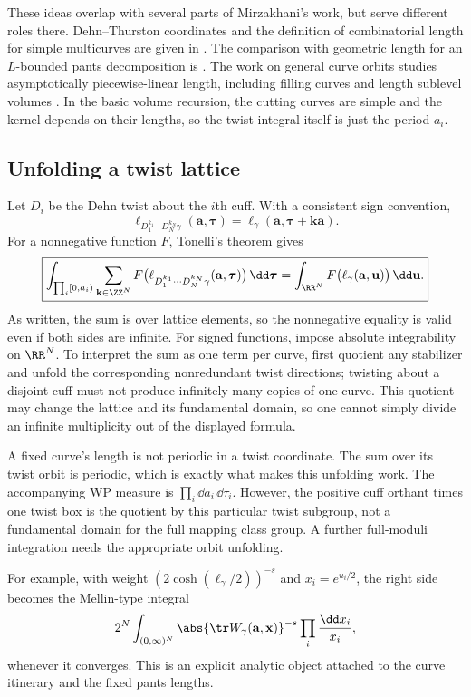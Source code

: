 These ideas overlap with several parts of Mirzakhani's work, but serve
different roles there. Dehn--Thurston coordinates and the definition of
combinatorial length for simple multicurves are given in
\cite[Theorem 3.4 and equation (3.6)]{MirzSimple}. The comparison with
geometric length for an $L$-bounded pants decomposition is
\cite[Proposition 3.5 and equation (3.7), p.~107]{MirzSimple}. The work
on general curve orbits studies asymptotically piecewise-linear length,
including filling curves and length sublevel volumes
\cite[Theorem 4.1 and Section 8]{MirzGeneral}. In the basic volume recursion, the
cutting curves are simple and the kernel depends on their lengths, so the
twist integral itself is just the period $a_i$.

\subsection{Unfolding a twist lattice}

Let $D_i$ be the Dehn twist about the $i$th cuff. With a consistent sign
convention,
\[
 \ell_{D_1^{k_1}\cdots D_N^{k_N}\gamma}(\mathbf a,\boldsymbol\tau)
 =\ell_\gamma(\mathbf a,\boldsymbol\tau+\mathbf k\mathbf a).
\]
For a nonnegative function $F$, Tonelli's theorem gives
\begin{equation}
 \boxed{
 \int_{\prod_i[0,a_i)}\sum_{\mathbf k\in\ZZ^N}
 F\bigl(\ell_{D_1^{k_1}\cdots D_N^{k_N}\gamma}
                  (\mathbf a,\boldsymbol\tau)\bigr)\,\dd\boldsymbol\tau
 =\int_{\RR^N}F\bigl(\ell_\gamma(\mathbf a,\mathbf u)\bigr)\,\dd\mathbf u.}
 \label{eq:twistunfold}
\end{equation}
As written, the sum is over lattice elements, so the nonnegative equality
is valid even if both sides are infinite. For signed functions, impose
absolute integrability on $\RR^N$. To interpret the sum as one term per
curve, first quotient any stabilizer and unfold the corresponding
nonredundant twist directions; twisting about a disjoint cuff must not
produce infinitely many copies of one curve. This quotient may change
the lattice and its fundamental domain, so one cannot simply divide an
infinite multiplicity out of the displayed formula.

A fixed curve's length is not periodic in a twist coordinate. The sum over
its twist orbit is periodic, which is exactly what makes this unfolding
work. The accompanying WP measure is $\prod_i\dd a_i\,\dd\tau_i$.
However, the positive cuff orthant times one twist box is the quotient by
this particular twist subgroup, not a fundamental domain for the full
mapping class group. A further full-moduli integration needs the appropriate
orbit unfolding.

For example, with weight $(2\cosh(\ell_\gamma/2))^{-s}$ and
$x_i=e^{u_i/2}$, the right side becomes the Mellin-type integral
\begin{equation}
 2^N\int_{(0,\infty)^N}
 \abs{\tr W_\gamma(\mathbf a,\mathbf x)}^{-s}
             \prod_i\frac{\dd x_i}{x_i},
 \label{eq:mellin}
\end{equation}
whenever it converges. This is an explicit analytic object attached to the
curve itinerary and the fixed pants lengths.
